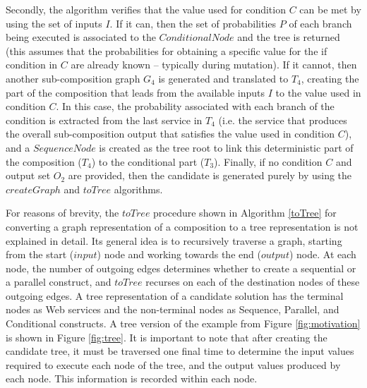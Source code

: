 \documentclass[conference]{IEEEtran}
\begin{document}
Secondly, the algorithm verifies that the value used for condition $C$ can be met by using the set of inputs $I$. If it can, then the set of probabilities $P$ of each branch being executed is associated to the $ConditionalNode$ and the tree is returned (this assumes that the probabilities for obtaining a specific value for the if condition in $C$ are already known -- typically during mutation). If it cannot, then another sub-composition graph $G_4$ is generated and translated to $T_4$, creating the part of the composition that leads from the available inputs $I$ to the value used in condition $C$. In this case, the probability associated with each branch of the condition is extracted from the last service in $T_4$ (i.e. the service that produces the overall sub-composition output that satisfies the value used in condition $C$), and a $SequenceNode$ is created as the tree root to link this deterministic part of the composition ($T_4$) to the conditional part ($T_3$). Finally, if no condition $C$ and output set $O_2$ are provided, then the candidate is generated purely by using the $createGraph$ and $toTree$ algorithms. 

For reasons of brevity, the $toTree$ procedure shown in Algorithm \ref{toTree} for converting a graph representation of a composition to a tree representation is not explained in detail. Its general idea is to recursively traverse a graph, starting from the start ($input$) node and working towards the end ($output$) node. At each node, the number of outgoing edges determines whether to create a sequential or a parallel construct, and $toTree$ recurses on each of the destination nodes of these outgoing edges. A tree representation of a candidate solution has the terminal nodes as Web services and the non-terminal nodes as Sequence, Parallel, and Conditional constructs. A tree version of the example from Figure \ref{fig:motivation} is shown in Figure \ref{fig:tree}. It is important to note that after creating the candidate tree, it must be traversed one final time to determine the input values required to execute each node of the tree, and the output values produced by each node. This information is recorded within each node.
\end{document}
